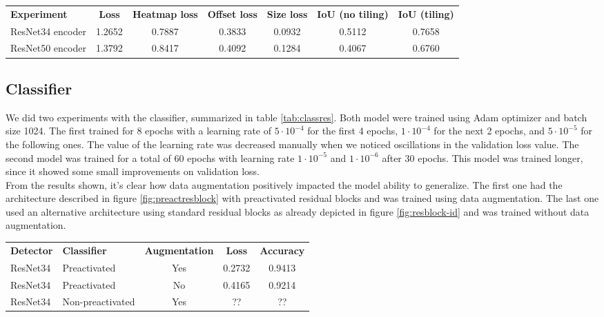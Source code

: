 \begin{table*}
	\begin{tabular}{lcccccc}
		\rowcolor[HTML]{EFEFEF} 
		\textbf{Experiment}   & \textbf{Loss} & \textbf{Heatmap loss} & \textbf{Offset loss} & \textbf{Size loss} & \textbf{IoU (no tiling)} & \textbf{IoU (tiling)} \\
		ResNet34 encoder      & 1.2652        & 0.7887                & 0.3833               & 0.0932             & 0.5112                   & 0.7658                \\
		ResNet50 encoder      & 1.3792        & 0.8417                & 0.4092               & 0.1284             & 0.4067                   & 0.6760
	\end{tabular}
	\caption{Experiments with two residual architecture for detection. The first one uses ResNet34 as an encoder, the second one uses the deeper ResNet50.}
	\label{tab:expdetector}
\end{table*}

\subsection{Classifier}
\label{ssec:classifierexp}

We did two experiments with the classifier, summarized in table \ref{tab:classres}. Both model were trained using Adam optimizer and batch size 1024. The first trained for 8 epochs with a learning rate of $5 \cdot 10^{-4}$ for the first 4 epochs, $1 \cdot 10^{-4}$ for the next 2 epochs, and $5 \cdot 10^{-5}$ for the following ones. The value of the learning rate was decreased manually when we noticed oscillations in the validation loss value. The second model was trained for a total of 60 epochs with learning rate $1 \cdot 10^{-5}$ and $1 \cdot 10^{-6}$ after 30 epochs. This model was trained longer, since it showed some small improvements on validation loss.\\ From the results shown, it's clear how data augmentation positively impacted the model ability to generalize. The first one had the architecture described in figure \ref{fig:preactresblock} with preactivated residual blocks and was trained using data augmentation. The last one used an alternative architecture using standard residual blocks as already depicted in figure \ref{fig:resblock-id} and was trained without data augmentation.

\begin{table*}[h]
	\begin{tabular}{llccc}
		\rowcolor[HTML]{EFEFEF} 
		\textbf{Detector} & \textbf{Classifier} & \textbf{Augmentation} & \textbf{Loss} & \textbf{Accuracy} \\
		ResNet34          & Preactivated        & Yes                   & 0.2732        & 0.9413            \\
		ResNet34          & Preactivated        & No                    & 0.4165        & 0.9214            \\
		ResNet34          & Non-preactivated    & Yes                   & ??            & ??               
	\end{tabular}
	\caption{Experiments with data augmentation on classifier.}
	\label{tab:classres}
\end{table*}

